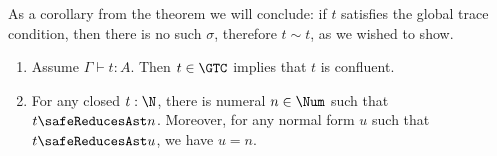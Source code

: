 As a corollary from the theorem we will conclude: 
if $t$ satisfies the global trace condition, then there is no such $\sigma$, therefore $t \sim t$, 
as we wished to show.

\begin{corollary}\label{cor:UniqueNF_typeN}
  \begin {enumerate}
  \item
    Assume $\Gamma\vdash t:A$. Then $t \in \GTC$ implies that $t$ is confluent. 
  \item
    For any closed $t:\N$, there is numeral $n\in\Num$ such that $t\safeReducesAst n$.
    Moreover, for any normal form $u$ such that $t \safeReducesAst u$, we have $u=n$. 
  \end{enumerate}
\end{corollary}




